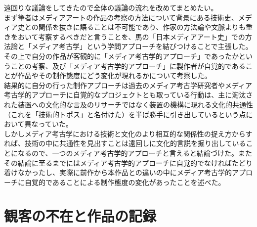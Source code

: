 \documentclass[a4paper,report]{jsbook}
\begin{document}
遠回りな議論をしてきたので全体の議論の流れを改めてまとめたい。\\
まず筆者はメディアアートの作品の考察の方法について背景にある技術史、メディア史との関係を抜きに語ることは不可能であり、作家の方法論や文脈よりも重きをおいて考察するべきだと言うことを、馬の「日本メディアアート史」での方法論と「メディア考古学」という学問アプローチを結びつけることで主張した。\\
その上で自分の作品が客観的に「メディア考古学的アプローチ」であったかということの考察、及び「メディア考古学的アプローチ」に製作者が自覚的であることが作品やその制作態度にどう変化が現れるかについて考察した。\\
結果的に自分の行った制作アプローチは過去のメディア考古学研究者やメディア考古学的アプローチに自覚的なプロジェクトとも取っている行動は、主に淘汰された装置への文化的な言及のリサーチではなく装置の機構に現れる文化的共通性（これを「技術的トポス」と名付けた）を半ば勝手に引き出しているという点において異なっていた。\\
しかしメディア考古学における技術と文化のより相互的な関係性の捉え方からすれば、技術の中に共通性を見出すことは遠回しに文化的言説を掘り出していることになるので、一つのメディア考古学的アプローチと言えると結論づけた。またその結論に至るまでにはメディア考古学的アプローチに自覚的でなければたどり着けなかったし、実際に前作から本作品との違いの中にメディア考古学的アプローチに自覚的であることによる制作態度の変化があったことを述べた。

\section{観客の不在と作品の記録}\label{ux89b3ux5ba2ux306eux4e0dux5728ux3068ux4f5cux54c1ux306eux8a18ux9332}
\end{document}
